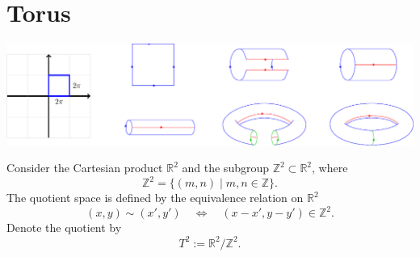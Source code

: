\documentclass[11pt,openany]{article}
\renewcommand{\Im}{\operatorname*{Im}}
\begin{document}
%	
%	
%	
%	
%	
%	
%	

\newpage
\section{Torus}
\begin{center}
\includegraphics[scale=.85]{../tikz/grad-math-tikz-algebra/torus.pdf}
\end{center}
Consider the Cartesian product \(\mathbb{R}^2\) and the subgroup \(\mathbb{Z}^2 \subset \mathbb{R}^2\), where
\[
\mathbb{Z}^2 = \{(m,n) \mid m,n \in \mathbb{Z}\}.
\]
The quotient space is defined by the equivalence relation on \(\mathbb{R}^2\)
\[
(x,y) \sim (x',y') \quad \Longleftrightarrow \quad (x-x',y-y') \in \mathbb{Z}^2.
\]
Denote the quotient by
\[
T^2 := \mathbb{R}^2/\mathbb{Z}^2.
\]
\end{document}
